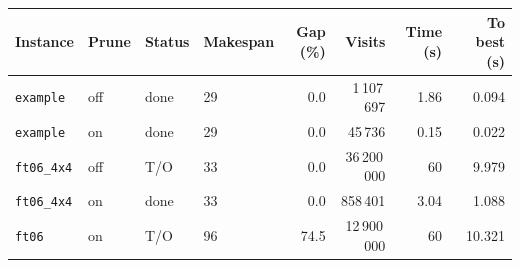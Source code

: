 \begin{tabular}{llllrrrr}
\toprule
Instance & Prune & Status & Makespan & Gap (\%) & Visits & Time (s) & To best (s) \\
\midrule
\texttt{example} & off & done & 29 & 0.0 & 1\,107\,697 & 1.86 & 0.094 \\
\texttt{example} & on & done & 29 & 0.0 & 45\,736 & 0.15 & 0.022 \\
\texttt{ft06\_4x4} & off & T/O & 33 & 0.0 & 36\,200\,000 & 60 & 9.979 \\
\texttt{ft06\_4x4} & on & done & 33 & 0.0 & 858\,401 & 3.04 & 1.088 \\
\texttt{ft06} & on & T/O & 96 & 74.5 & 12\,900\,000 & 60 & 10.321 \\
\bottomrule
\end{tabular}

